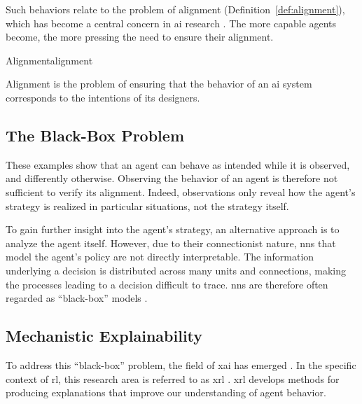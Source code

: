 Such behaviors relate to the problem of alignment (Definition~\ref{def:alignment}), which has become a central concern in \gls{ai} research \parencite{ji2023ai}.
The more capable agents become, the more pressing the need to ensure their alignment.

\begin{definition}{Alignment}{alignment}

Alignment is the problem of ensuring that the behavior of an \gls{ai} system corresponds to the intentions of its designers.

\end{definition}

\subsection{The Black-Box Problem}

These examples show that an agent can behave as intended while it is observed, and differently otherwise.
Observing the behavior of an agent is therefore not sufficient to verify its alignment.
Indeed, observations only reveal how the agent's strategy is realized in particular situations, not the strategy itself.

To gain further insight into the agent's strategy, an alternative approach is to analyze the agent itself.
However, due to their connectionist nature, \glspl{nn} that model the agent's policy are not directly interpretable.
The information underlying a decision is distributed across many units and connections, making the processes leading to a decision difficult to trace.
\Glspl{nn} are therefore often regarded as \enquote{black-box} models \parencite{guidotti2018survey}.

\subsection{Mechanistic Explainability}

To address this \enquote{black-box} problem, the field of \gls{xai} has emerged \parencite{gunning2019darpa, arrieta2020explainable}.
In the specific context of \gls{rl}, this research area is referred to as \gls{xrl} \parencite{puiutta2020explainable, milani2022explainable}.
\gls{xrl} develops methods for producing explanations that improve our understanding of agent behavior.


